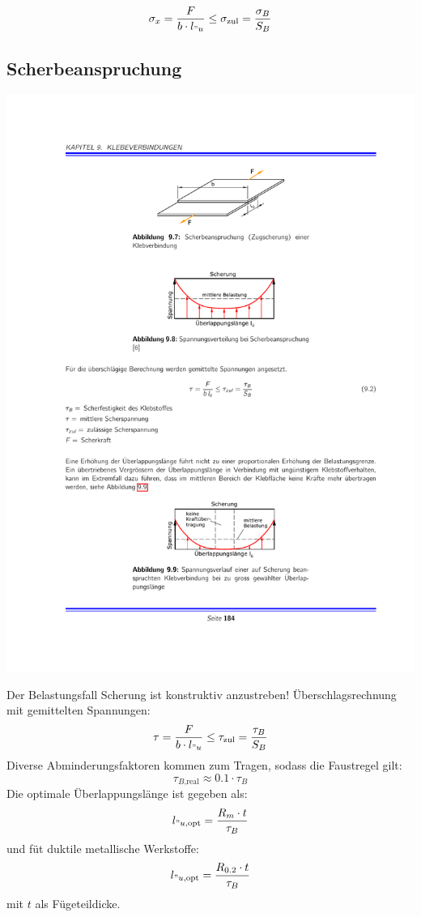 		\begin{equation*}
			\sigma_x = \frac{F}{b \cdot l_{"u}} \leq \sigma_{\text{zul}}= \frac{\sigma_B}{S_B}
		\end{equation*}
	\subsection{Scherbeanspruchung} %
		\begin{center}
			\includegraphics[width=.6\columnwidth]{graphics/klebe_scher}
		\end{center}
		
		Der Belastungsfall Scherung ist konstruktiv anzustreben! Überschlagsrechnung mit gemittelten Spannungen:
		\begin{equation*}
			\tau = \frac{F}{b \cdot l_{"u}} \leq \tau_{\text{zul}} = \frac{\tau_B}{S_B}
		\end{equation*}
		Diverse Abminderungsfaktoren kommen zum Tragen, sodass die Faustregel gilt:
		\begin{equation*}
			\tau_{B\text{,real}} \approx 0.1 \cdot \tau_B
		\end{equation*}
		Die optimale Überlappungslänge ist gegeben als:
		\begin{equation*}
			l_{"u\text{,opt}} = \frac{R_m \cdot t}{\tau_B}
		\end{equation*}
		und füt duktile metallische Werkstoffe:
		\begin{equation*}
			l_{"u\text{,opt}} = \frac{R_{0.2} \cdot t}{\tau_B}
		\end{equation*}
		mit $t$ als Fügeteildicke.
